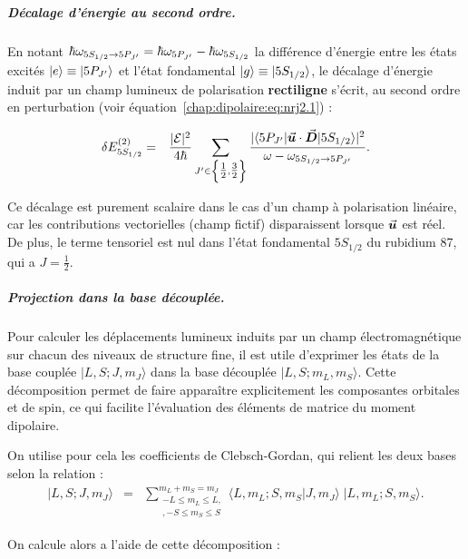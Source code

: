 \subparagraph{Décalage d’énergie au second ordre.}

En notant $\hbar\omega_{\tiny 5S_{1/2} \rightarrow 5P_{J'}} = \hbar\omega_{5P_{J'}} - \hbar\omega_{5S_{1/2}}$ la différence d’énergie entre les états excités $\ket{e} \equiv \ket{5P_{J'}}$ et l’état fondamental $\ket{g} \equiv \ket{5S_{1/2}}$, le décalage d’énergie induit par un champ lumineux de polarisation \textbf{rectiligne} s’écrit, au second ordre en perturbation (voir équation~\eqref{chap:dipolaire:eq:nrj2.1}) :

\begin{eqnarray}
	\delta E_{5S_{1/2}}^{(2)} & = & \frac{|\mathcal{E}|^2}{4\hbar} \sum_{J' \in \left\{ \tfrac{1}{2}, \tfrac{3}{2} \right\}} 
		\frac{|\langle 5P_{J'}|\vec{{\bm{u}}} \cdot \vec{{\bm{D}}}|5S_{1/2}\rangle|^2}{\omega - \omega_{\tiny 5S_{1/2} \rightarrow 5P_{J'}}}.
	\label{chap:dipolaire:eq:nrj2.3}
\end{eqnarray}

Ce décalage est purement scalaire dans le cas d’un champ à polarisation linéaire, car les contributions vectorielles (champ fictif) disparaissent lorsque $\vec{{\bm{u}}}$ est réel. De plus, le terme tensoriel est nul dans l’état fondamental $5S_{1/2}$ du rubidium 87, qui a $J = \tfrac{1}{2}$.




\subparagraph{Projection dans la base découplée.}

Pour calculer les déplacements lumineux induits par un champ électromagnétique sur chacun des niveaux de structure fine, il est utile d'exprimer les états de la base couplée $|L, S; J, m_J\rangle$ dans la base découplée $|L, S; m_L, m_S\rangle$. Cette décomposition permet de faire apparaître explicitement les composantes orbitales et de spin, ce qui facilite l’évaluation des éléments de matrice du moment dipolaire.

On utilise pour cela les coefficients de Clebsch-Gordan, qui relient les deux bases selon la relation :
\begin{eqnarray}
	|L, S; J, m_J\rangle  &=& \sum_{\substack{-L \leq m_L \leq L,\\, -S \leq m_S \leq S  }}^{m_L + m_S = m_J} \langle L, m_L; S, m_S | J, m_J \rangle \; |L, m_L; S, m_S\rangle.
\end{eqnarray}

On calcule alors a l'aide de cette décomposition :

